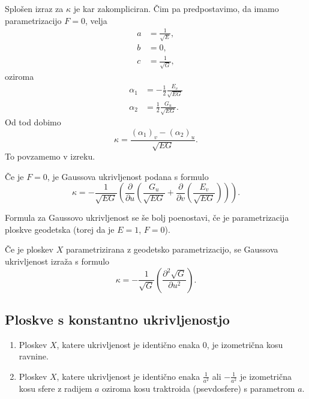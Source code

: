 \begin{opomba}
Splošen izraz za $\kappa$ je kar zakompliciran. Čim pa predpostavimo, da imamo parametrizacijo $F  =0$, velja \begin{align*}
    a &= \frac{1}{\sqrt{E} },\\
    b &= 0, \\
    c &= \frac{1}{\sqrt{G}},
\end{align*}oziroma \begin{align*}
    \alpha_1 &= -\frac{1}{2} \frac{E_v}{\sqrt{EG} } \\
    \alpha_2 &= \frac{1}{2} \frac{G_u}{\sqrt{EG} }.
\end{align*}
Od tod dobimo \begin{equation*}
\kappa  = \frac{(\alpha_1)_v - (\alpha_2)_u}{\sqrt{EG}}.
\end{equation*}
To povzamemo v izreku.
\end{opomba}

\begin{izrek}
\label{izr_gaussova_ukrivljenost_v_primeru_F_enako_0}
Če je $F = 0$, je Gaussova ukrivljenost podana s formulo \begin{equation*}
\kappa = - \frac{1}{\sqrt{EG}} \left(\frac{ \partial  }{ \partial u }  \left(  \frac{G_u}{\sqrt{EG} } + \frac{ \partial  }{ \partial v } \left( \frac{E_v}{\sqrt{EG} } \right)  \right)   \right).
\end{equation*}  
\end{izrek}

Formula za Gaussovo ukrivljenost se še bolj poenostavi, če je parametrizacija ploskve geodetska (torej da je $E = 1$, $F = 0$).

\begin{izrek}
\label{izr_gaussova_ukrivljenost_pri_geodetski_parametrizaciji}
 Če je ploskev $X$ parametrizirana z geodetsko parametrizacijo, se Gaussova ukrivljenost izraža s formulo \begin{equation*}
 \kappa = - \frac{1}{\sqrt{G}} \left(  \frac{ \partial^{2} \sqrt{G}  }{ \partial u^{2} }  \right).
 \end{equation*}  
   
\end{izrek}

\subsection{Ploskve s konstantno ukrivljenostjo}
\begin{izrek}
\label{izr_klasifikacija_ploskev_z_ukrivljenostjo_0}
 \begin{enumerate}
    \item Ploskev $X$, katere ukrivljenost je identično enaka $0$, je izometrična kosu ravnine.
    \item Ploskev $X$, katere ukrivljenost je identično enaka $\frac{1}{a^2}$ ali $-\frac{1}{a^2}$ je izometrična kosu sfere z radijem $a$ oziroma
    kosu traktroida (psevdosfere) s parametrom $a$.
 \end{enumerate}
\end{izrek}

